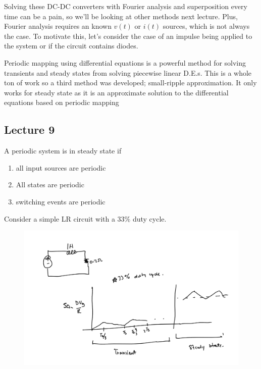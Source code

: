 \documentclass[../notes.tex]{subfiles}
\begin{document}
Solving these DC-DC converters with Fourier analysis and superposition every time can be a pain, so we'll be looking at other methods next lecture.
Plus, Fourier analysis requires an known $ v(t)$ or $ i(t) $ sources, which is not always the case. 
To motivate this, let's consider the case of an impulse being applied to the system or if the circuit contains diodes.




Periodic mapping using differential equations is a powerful method for solving transients and steady states from solving piecewise linear D.E.s.
This is a whole ton of work so a third method was developed; small-ripple approximation. It only works for steady state as it is an approximate solution to the differential equations based on periodic mapping




\subsection{Lecture 9}

A periodic  system is in steady state if

\begin{enumerate}
	\item all input sources are periodic
	\item All states are periodic
	\item switching events are periodic
\end{enumerate}

Consider a simple LR circuit with a $ 33\% $ duty cycle.

\begin{figure}[H]
	\centering
	\includegraphics[width=0.8\linewidth]{img/image_2022-09-26-11-35-36.png}
\end{figure}
\end{document}
